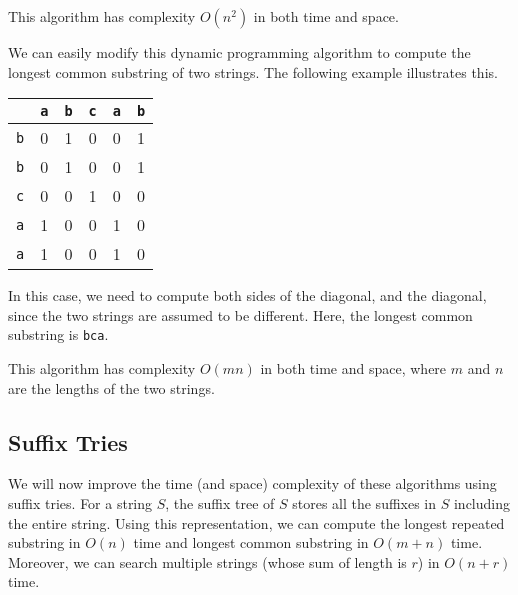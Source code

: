 \documentclass[a4paper, openany]{memoir}
\begin{document}
    This algorithm has complexity $O(n^2)$ in both time and space.
    
    We can easily modify this dynamic programming algorithm to compute the longest common substring of two strings. The following example illustrates this.
    \begin{table}[H]
        \centering
        \begin{tabular}{c|ccccc}
            & \texttt{a} & \texttt{b} & \texttt{c} & \texttt{a} & \texttt{b} \\
            \hline
            \texttt{b} & 0 & 1 & 0 & 0 & 1 \\
            \texttt{b} & 0 & {\color{red}1} & 0 & 0 & 1 \\
            \texttt{c} & 0 & 0 & {\color{red}1} & 0 & 0 \\
            \texttt{a} & 1 & 0 & 0 & {\color{red}1} & 0 \\
            \texttt{a} & 1 & 0 & 0 & 1 & 0
        \end{tabular}
    \end{table}
    \noindent In this case, we need to compute both sides of the diagonal, and the diagonal, since the two strings are assumed to be different. Here, the longest common substring is \texttt{bca}.

    This algorithm has complexity $O(mn)$ in both time and space, where $m$ and $n$ are the lengths of the two strings.

    \subsection{Suffix Tries}
    We will now improve the time (and space) complexity of these algorithms using suffix tries. For a string $S$, the suffix tree of $S$ stores all the suffixes in $S$ including the entire string. Using this representation, we can compute the longest repeated substring in $O(n)$ time and longest common substring in $O(m+n)$ time. Moreover, we can search multiple strings (whose sum of length is $r$) in $O(n+r)$ time.
\end{document}
